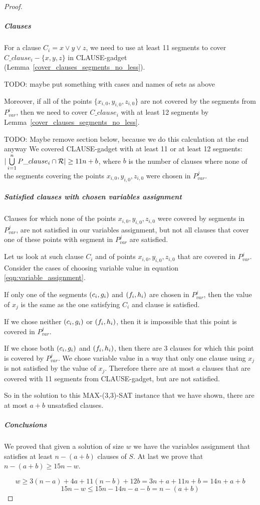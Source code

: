 \begin{proof}
\subparagraph{Clauses}

For a clause $C_i = x \lor y \lor z$,
we need to use at least 11 segments to cover $C\_clause_i - \{x, y, z\}$
in CLAUSE-gadget (Lemma~\ref{cover_clauses_segments_no_less}).

TODO: maybe put something with cases and names of sets as above

Moreover, if all of the points $\{x_{i,0}, y_{i,0}, z_{i,0}\}$
are not covered by the segments from $P_{var}^i$,
then we need to cover $C\_clause_i$
with at least 12 segments
by Lemma~\ref{cover_clauses_segments_no_less}.


TODO: Maybe remove section below, because we do this calculation at the end anyway
We covered CLAUSE-gadget with at least 11 or at least 12 segments:
$|\bigcup\limits_{i=1}^n P\_clause_i \cap \mathcal{R}| \ge 11n + b$,
where $b$ is the number of clauses
where none of the segments covering the points $x_{i,0}, y_{i,0}, z_{i,0}$ were chosen
in $P_{var}^j$.

\subparagraph{Satisfied clauses with chosen variables assignment}

Clauses for which none of
the points $x_{i,0}, y_{i,0}, z_{i,0}$ were covered by segments in $P_{var}^j$,
are not satisfied in our variables assignment, but not all clauses
that cover one of these points with segment in $P_{var}^j$ are satisfied.

Let us look at such clause $C_i$ and of points $x_{i,0}, y_{i,0}, z_{i,0}$
that are covered in $P_{var}^j$.
Consider the cases of choosing variable value in
equation \eqref{eqn:variable_assignment}.

If only one of the segments $(c_i, g_i)$ and $(f_i, h_i)$
are chosen in $P_{var}^{j}$, then the value of $x_j$
is the same as the one satisfying $C_i$ and clause is satisfied.

If we chose neither $(c_i, g_i)$ or $(f_i, h_i)$,
then it is impossible that this point is covered in $P_{var}^j$.

If we chose both $(c_i, g_i)$ and $(f_i, h_i)$,
then there are 3 clauses for which this point
is covered by $P_{var}^j$. We chose variable value in a way
that only one clause using $x_j$ is not satisfied by the value of $x_j$.
Therefore there are at most $a$ clauses that are covered with
11 segments from CLAUSE-gadget, but are not satisfied.

So in the solution to this MAX-(3,3)-SAT instance that we have shown,
there are at most $a+b$ unsatsfied clauses.

\subparagraph{Conclusions}

We proved that given a solution of size $w$ we have
the variables assignment that satisfies at least $n-(a+b)$ clauses of $S$.
At last we prove that $n-(a+b) \ge 15n-w$.

$$w \ge 3(n-a) + 4a + 11(n-b) + 12b = 3n + a + 11n + b = 14n + a + b$$
$$15n - w  \le 15n - 14n - a - b = n - (a+b)$$
\end{proof}



